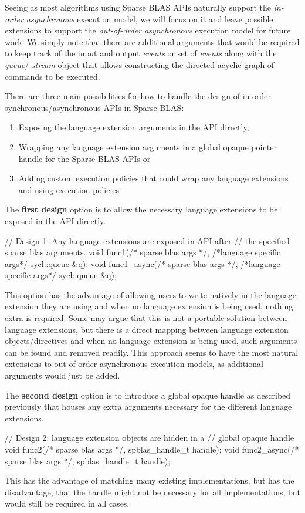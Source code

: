 \documentclass{article}
\begin{document}
Seeing as most algorithms using Sparse BLAS APIs naturally support the \textit{in-order asynchronous} execution model, we will focus on it and leave possible extensions to support the \textit{out-of-order asynchronous} execution model for future work.  We simply note that there are additional arguments that would be required to keep track of the input and output \textit{events} or set of \textit{events} along with the \textit{queue}/ \textit{stream} object that allows constructing the directed acyclic graph of commands to be executed.

There are three main possibilities for how to handle the design of in-order synchronous/asynchronous APIs in Sparse BLAS:
\begin{enumerate}
    \item Exposing the language extension arguments in the API directly, 
    \item Wrapping any language extension arguments in a global opaque pointer handle for the Sparse BLAS APIs or 
    \item Adding custom execution policies that could wrap any language extensions and using execution policies 
\end{enumerate}
The \textbf{first design} option is to allow the necessary language extensions to be exposed in the API directly.
\begin{lstlistings}
// Design 1: Any language extensions are exposed in API after
//           the specified sparse blas arguments.
void func1(/* sparse blas args */,
           /*language specific args*/ sycl::queue &q);
void func1_async(/* sparse blas args */, 
                 /*language specific args*/ sycl::queue &q);
\end{lstlistings}
This option has the advantage of allowing users to write natively in the language extension they are using and when no language extension is being used, nothing extra is required. Some may argue that this is not a portable solution between language extensions, but there is a direct mapping between language extension objects/directives and when no language extension is being used, such arguments can be found and removed readily.  This approach seems to have the most natural extensions to out-of-order asynchronous execution models, as additional arguments would just be added.

The \textbf{second design} option is to introduce a global opaque handle as described previously that houses any extra arguments necessary for the different language extensions.
\begin{lstlistings}
// Design 2: language extension objects are hidden in a
//           global opaque handle
void func2(/* sparse blas args */, spblas_handle_t handle);
void func2_async(/* sparse blas args */, spblas_handle_t handle);
\end{lstlistings}
This has the advantage of matching many existing implementations, but has the disadvantage, that the handle might not be necessary for all implementations, but would still be required in all cases.
\end{document}

